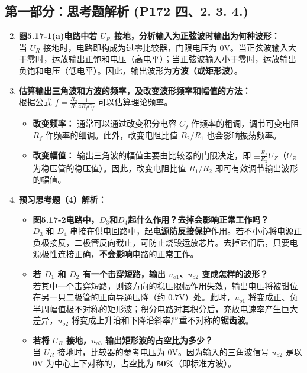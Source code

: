 \documentclass[10.5pt]{config}
\begin{document}
\subsection*{第一部分：思考题解析 (P172 四、2. 3. 4.)}
\begin{enumerate}[label=\arabic*., leftmargin=2em]
    \setcounter{enumi}{1}
    \item \textbf{图5.17-1(a)电路中若 $U_R$ 接地，分析输入为正弦波时输出为何种波形：} \\
    当 $U_R$ 接地时，电路即构成为过零比较器，门限电压为 $0\mathrm{V}$。当正弦波输入大于零时，运放输出正饱和电压（高电平）；当正弦波输入小于零时，运放输出负饱和电压（低电平）。因此，输出波形为\textbf{方波（或矩形波）}。
    
    \item \textbf{估算输出三角波和方波的频率，及改变波形频率和幅值的方法：} \\
    根据公式 $f = \frac{R_2}{R_1} \frac{1}{4 R_f C_f}$ 可以估算理论频率。
    \begin{itemize}
        \item \textbf{改变频率：} 通常可以通过改变积分电容 $C_f$ 作频率的粗调，调节可变电阻 $R_f$ 作频率的细调。此外，改变电阻比值 $R_2/R_1$ 也会影响振荡频率。
        \item \textbf{改变幅值：} 输出三角波的幅值主要由比较器的门限决定，即 $\pm \frac{R_1}{R_2}U_Z$（$U_Z$ 为稳压管的稳压值）。因此，改变电阻比值 $R_1/R_2$ 即可有效调节输出波形的幅值。
    \end{itemize}

    \item \textbf{预习思考题（4）解析：}
    \begin{itemize}
        \item [(1)] \textbf{图5.17-2电路中，$D_3$和$D_4$起什么作用？去掉会影响正常工作吗？} \\
        $D_3$ 和 $D_4$ 串接在供电回路中，起\textbf{电源防反接保护}作用。若不小心将电源正负极接反，二极管反向截止，可防止烧毁运放芯片。去掉它们后，只要电源极性连接正确，\textbf{不会影响}电路的正常工作。
        \item [(2)] \textbf{若 $D_1$ 和 $D_2$ 有一个击穿短路，输出 $u_{o1}$、$u_{o2}$ 变成怎样的波形？} \\
        若其中一个击穿短路，则该方向的稳压限幅作用失效，输出电压将被钳位在另一只二极管的正向导通压降（约 $0.7\mathrm{V}$）处。此时，$u_{o1}$ 将变成正、负半周幅值极不对称的矩形波；积分电路对其积分后，充放电速率产生巨大差异，$u_{o2}$ 将变成上升沿和下降沿斜率严重不对称的\textbf{锯齿波}。
        \item [(3)] \textbf{若将 $U_R$ 接地，$u_{o3}$ 输出矩形波的占空比为多少？} \\
        当 $U_R$ 接地时，比较器的参考电压为 $0\mathrm{V}$。因为输入的三角波信号 $u_{o2}$ 是以 $0\mathrm{V}$ 为中心上下对称的，占空比为 \textbf{50\%}（即标准方波）。
    \end{itemize}
\end{enumerate}
\end{document}
